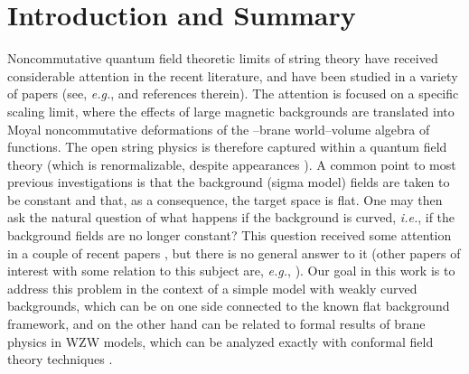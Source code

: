 \documentclass[a4paper,11pt]{article}
\begin{document}
\renewcommand{\thefootnote}{\arabic{footnote}} \setcounter{footnote}{0}

\newpage \begin{tableofcontents}
\end{tableofcontents}
\pagebreak


\section{Introduction and Summary}


Noncommutative quantum field theoretic limits of string theory have
received considerable attention in the recent literature, and have been
studied in a variety of papers (see, \textit{e.g.}, \cite{CDS,
Cheung-Krogh, Schomerus, Cornalba-Schiappa, Seiberg-Witten, Cornalba-2} and
references therein). The attention is focused on a specific scaling limit,
where the effects of large magnetic backgrounds are translated into Moyal
noncommutative deformations of the \coordHE{}--brane world--volume algebra of
functions. The open string physics is therefore captured within a quantum
field theory (which is renormalizable, despite appearances \cite{MRS,
MST}). A common point to most previous investigations is that the
background (sigma model) fields are taken to be constant and that, as a
consequence, the target space is flat. One may then ask the natural
question of what happens if the background is curved, \textit{i.e.}, if the
background fields are no longer constant?  This question received some
attention in a couple of recent papers \cite{Anazawa, ARS-1, ARS-2,
Ho-Yeh}, but there is no general answer to it (other papers of interest
with some relation to this subject are, \textit{e.g.}, \cite{Chu-Ho-Kao,
Ydri, Sahakian, Dasgupta-Yin}). Our goal in this work is to address this
problem in the context of a simple model with weakly curved backgrounds,
which can be on one side connected to the known flat background framework,
and on the other hand can be related to formal results of brane physics in
WZW models, which can be analyzed exactly with conformal field theory
techniques \cite{ARS-1, ARS-2, BSD}.
\end{document}
